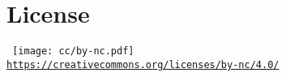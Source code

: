 
\thispagestyle{empty} %
\flushbottom %
\maketitle %



\section*{License}

    \scriptsize\noindent%
    \begin{minipage}{\columnwidth}
        \centering\tt
        \texttt{[image: cc/by-nc.pdf]}\\[0.5\smallskipamount]
        {\scriptsize\url{https://creativecommons.org/licenses/by-nc/4.0/}}
    \end{minipage}
    \normalsize



\tableofcontents



